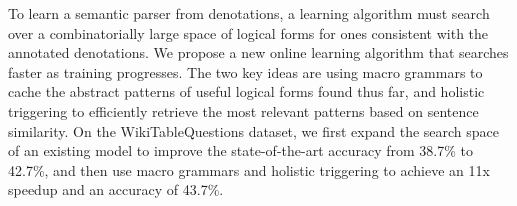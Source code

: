 To learn a semantic parser from denotations, a learning algorithm must search over a combinatorially large space of logical forms for ones consistent with the annotated denotations. We propose a new online learning algorithm that searches faster as training progresses. The two key ideas are using macro grammars to cache the abstract patterns of useful logical forms found thus far, and holistic triggering to efficiently retrieve the most relevant patterns based on sentence similarity. On the WikiTableQuestions dataset, we first expand the search space of an existing model to improve the state-of-the-art accuracy from 38.7\% to 42.7\%, and then use macro grammars and holistic triggering to achieve an 11x speedup and an accuracy of 43.7\%.
